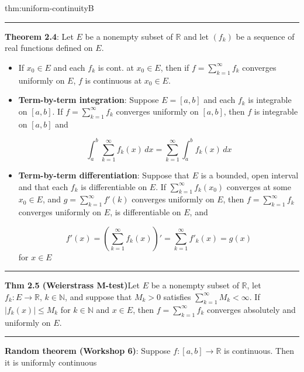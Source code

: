 \documentclass[landscape, 8pt]{extarticle}
\begin{document}
\begin{multicols}{3}
\begin{thm}{thm:uniform-continuity}{B}
	\noindent\rule{\textwidth}{0.2pt}
	\textbf{Theorem 2.4}: Let $E$ be a nonempty subset of $\mathbb{R}$ and let $(f_{k})$ be a sequence of real functions defined on $E$.

	\begin{itemize}
		\setlength\itemsep{0em}
		\item If $x_{0}\in E$ and each $f_{k}$ is cont. at $x_{0}\in E$, then if $f=\sum_{k=1}^{\infty}f_{k}$ converges uniformly on $E$, $f$ is continuous at $x_{0}\in E$.

		\item \textbf{Term-by-term integration}: Suppose $E=[a,b]$ and each $f_{k}$ is integrable on $[a,b]$. If $f=\sum_{k=1}^{\infty} f_{k}$ converges uniformly on $[a,b]$, then $f$ is integrable on $[a,b]$ and

		\[\int_{a}^{b} \sum_{k=1}^{\infty} f_{k}(x) \, dx =\sum_{k=1}^{\infty} \int_{a}^{b} f_{k}(x) \, dx \]
		\item \textbf{Term-by-term differentiation}: Suppose that $E$ is a bounded, open interval and that each $f_{k}$ is differentiable on $E$. If $\sum_{k=1}^{\infty}f_{k}(x_{0})$ converges at some $x_{0}\in E$, and $g=\sum_{k=1}^{\infty}f'(k)$ converges uniformly on $E$, then $f= \sum_{k=1}^{\infty}f_{k}$ converges uniformly on $E$, is differentiable on $E$, and

		\[f'(x)=\left( \sum_{k=1}^{\infty} f_{k}(x) \right)'=\sum_{k=1}^{\infty} f'_{k}(x)=g(x)\]
		for $x\in E$

	\end{itemize}

	\noindent\rule{\textwidth}{0.2pt}

	\textbf{Thm 2.5 (Weierstrass M-test)}Let $E$ be a nonempty subset of $\mathbb{R}$, let $f_{k}: E\to \mathbb{R},\,k\in\mathbb{N}$, and suppose that $M_{k}>0$ satisfies $\sum_{k=1}^{\infty} M_{k}<\infty$. If $\lvert f_{k}(x) \rvert \le M_{k}$ for $k\in \mathbb{N}$ and $x\in E$,  then $f=\sum_{k=1}^{\infty}f_{k}$ converges absolutely and uniformly on $E$.

	\noindent\rule{\textwidth}{0.2pt}
	\textbf{Random theorem (Workshop 6)}: Suppose $f : [a,b]\to \mathbb{R}$ is continuous. Then it is uniformly continuous
\end{thm}


\end{multicols}
\end{document}
